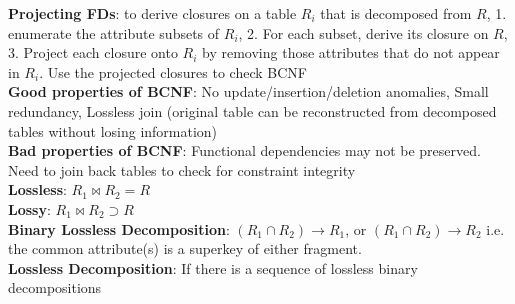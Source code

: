 \documentclass{article}
\begin{document}
{\begin{multicols*}{3}
\textbf{Projecting FDs}: to derive closures on a table $R_i$ that is decomposed from $R$, 1. enumerate the attribute subsets of $R_i$, 2. For each subset, derive its closure on $R$, 3. Project each closure onto $R_i$ by removing those attributes that do not appear in $R_i$. Use the projected closures to check BCNF\\
\textbf{Good properties of BCNF}: No update/insertion/deletion anomalies, Small redundancy, Lossless join (original table can be reconstructed from decomposed tables without losing information) \\
\textbf{Bad properties of BCNF}: Functional dependencies may not be preserved. Need to join back tables to check for constraint integrity \\
\textbf{Lossless}: $R_1\bowtie R_2=R$\\
\textbf{Lossy}: $R_1\bowtie R_2\supset R$\\
\textbf{Binary Lossless Decomposition}: $(R_1\cap R_2)\to R_1$, or $(R_1\cap R_2)\to R_2$ i.e. the common attribute(s) is a superkey of either fragment. \\
\textbf{Lossless Decomposition}: If there is a sequence of lossless binary decompositions

\end{multicols*}}
\end{document}
